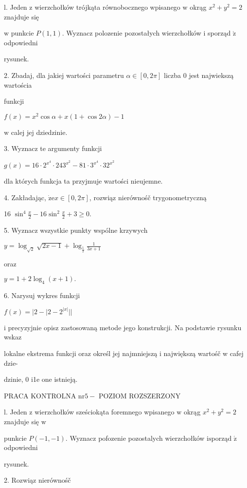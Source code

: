 \documentclass[a4paper,12pt]{article}
\begin{document}
l. Jeden $\mathrm{z}$ wierzchołków trójkąta równobocznego wpisanego $\mathrm{w}$ okrąg $x^{2}+y^{2}=2$ znajduje się

$\mathrm{w}$ punkcie $P(1,1)$. Wyznacz polozenie pozostałych wierzchołków $\mathrm{i}$ sporząd $\acute{\mathrm{z}}$ odpowiedni

rysunek.

2. Zbadaj, dla jakiej wartości parametru $\alpha \in [0,2\pi]$ liczba 0 jest najwiekszą wartościa

funkcji

$f(x)=x^{2}\cos\alpha+x(1+\cos 2\alpha)-1$

$\mathrm{w}$ calej jej dziedzinie.

3. Wyznacz te argumenty funkcji

$g(x)=16\cdot 2^{x^{4}}\cdot 243^{x^{2}}-81\cdot 3^{x^{4}}\cdot 32^{x^{2}}$

dla których funkcja ta przyjmuje wartości nieujemne.

4. Zakładając, $\dot{\mathrm{z}}\mathrm{e}x\in[0,2\pi]$, rozwiąz nierównośč trygonometryczną

16 $\displaystyle \sin^{4}\frac{x}{2}-16\sin^{2}\frac{x}{2}+3\geq 0.$

5. Wyznacz wszystkie punkty wspólne krzywych

$y=\displaystyle \log_{\sqrt{2}}\sqrt{2x-1}+\log_{\frac{1}{2}}\frac{1}{3x+1}$

oraz

$y=1+2\log_{4}(x+1).$

6. Narysuj wykres funkcji

$f(x)=|2-|2-2^{|x|}||$

i precyzyjnie opisz zastosowaną metode jego konstrukcji. Na podstawie rysunku wskaz

lokalne ekstrema funkcji oraz określ jej najmniejszą i największą wartośč w cafej dzie-

dzinie, 0 i1e one istnieją.




PRACA KONTROLNA $\mathrm{n}\mathrm{r} 5-$ POZIOM ROZSZERZONY

l. Jeden $\mathrm{z}$ wierzchołków sześciokąta foremnego wpisanego $\mathrm{w}$ okrąg $x^{2}+y^{2}=2$ znajduje się $\mathrm{w}$

punkcie $P(-1,-1)$. Wyznacz pofozenie pozostalych wierzchołków $\mathrm{i}\mathrm{s}$porząd $\acute{\mathrm{z}}$ odpowiedni

rysunek.

2. Rozwiąz nierównośč
\end{document}
